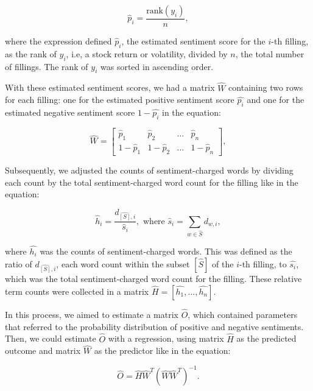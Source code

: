 \documentclass[logo,bsc,singlespacing,parskip]{infthesis}
\begin{document}
\begin{equation} \label{4.4}
\hat{p}_i = \frac{\text{rank}(y_i)}{n},
\end{equation}

where the expression defined $\hat{p}_i$, the estimated sentiment score for the $i$-th filling, as the rank of $y_i$, i.e, a stock return or volatility, divided by $n$, the total number of fillings. The rank of $y_i$ was sorted in ascending order. 

With these estimated sentiment scores, we had a matrix $\hat{W}$ containing two rows for each filling: one for the estimated positive sentiment score $\hat{p_i}$ and one for the estimated negative sentiment score $1-\hat{p_i}$ in the equation:

\begin{equation} \label{4.5}
\hat{W} = \begin{bmatrix}    \hat{p}_1 & \hat{p}_2 & \dots & \hat{p}_n \\    1-\hat{p}_1 & 1-\hat{p}_2 & \dots & 1-\hat{p}_n\end{bmatrix},
\end{equation}

Subsequently, we adjusted the counts of sentiment-charged words by dividing each count by the total sentiment-charged word count for the filling like in the equation:

\begin{equation} \label{4.6}
\hat{h}_i = \frac{d_{\hat{[S]}, i}}{\hat{s}_i}, \text{ where } \hat{s}_i = \sum_{w \in \hat{S}} d_{w,i},
\end{equation}

where $\hat{h_i}$ was the counts of sentiment-charged words. This was defined as the ratio of $d_{\hat{[S]}, i}$, each word count within the subset $[\hat{S}]$ of the $i$-th filling, to $\hat{s_i}$, which was the total sentiment-charged word count for the filling. These relative term counts were collected in a matrix $\hat{H} = [\hat{h_1},...,\hat{h_n}]  $. 

In this process, we aimed to estimate a matrix $\hat{O}$, which contained parameters that referred to the probability distribution of positive and negative sentiments. Then, we could estimate $\hat{O}$ with a regression, using matrix $\hat{H}$ as the predicted outcome and matrix $\hat{W}$ as the predictor like in the equation:

\begin{equation} \label{4.7}
\hat{O} = \hat{H}\hat{W}^T (\hat{W}\hat{W}^T)^{-1}.
\end{equation}
\end{document}
